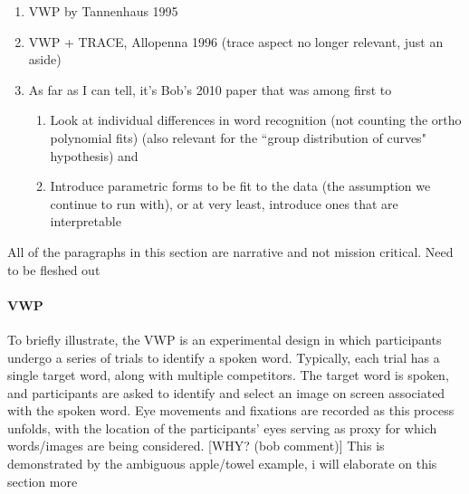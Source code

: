 \documentclass{article}
\begin{document}
\begin{singlespace}
\begin{enumerate}
\vspace{-2mm}
\item VWP by Tannenhaus 1995 \cite{tanenhaus1995integration}
\item VWP + TRACE, Allopenna 1996 (trace aspect no longer relevant, just an aside) \cite{allopenna1998tracking}
\item As far as I can tell, it's Bob's 2010 paper that was among first to \cite{mcmurray2010individual}
\begin{enumerate}
\item Look at individual differences in word recognition (not counting the ortho polynomial fits) (also relevant for the ``group distribution of curves" hypothesis) and
\item Introduce parametric forms to be fit to the data (the assumption we continue to run with), or at very least, introduce ones that are interpretable
\end{enumerate}
\end{enumerate}
\end{singlespace}

All of the paragraphs in this section are narrative and not mission critical. Need to be fleshed out


\paragraph{VWP} To briefly illustrate, the VWP is an experimental design in which participants undergo a series of trials to identify a spoken word. Typically, each trial has a single target word, along with multiple competitors. The target word is spoken, and participants are asked to identify and select an image on screen associated with the spoken word. Eye movements and fixations are recorded as this process unfolds, with the location of the participants' eyes serving as proxy for which words/images are being considered. [WHY? (bob comment)] This is demonstrated by the ambiguous apple/towel example, i will elaborate on this section more
\end{document}
